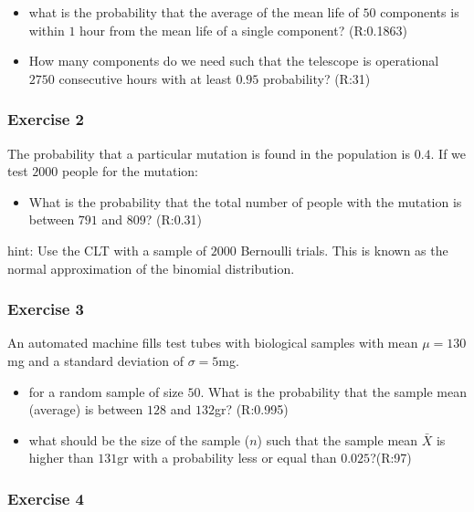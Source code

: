 \documentclass[
]{book}
\providecommand{\tightlist}{%
  \setlength{\itemsep}{0pt}\setlength{\parskip}{0pt}}
\begin{document}
\begin{itemize}
\item
  what is the probability that the average of the mean life of \(50\) components is within \(1\) hour from the mean life of a single component? (R:0.1863)
\item
  How many components do we need such that the telescope is operational \(2750\) consecutive hours with at least \(0.95\) probability? (R:31)
\end{itemize}

\hypertarget{exercise-2-8}{%
\subsubsection{Exercise 2}\label{exercise-2-8}}

The probability that a particular mutation is found in the population is \(0.4\). If we test \(2000\) people for the mutation:

\begin{itemize}
\tightlist
\item
  What is the probability that the total number of people with the mutation is between \(791\) and \(809\)? (R:0.31)
\end{itemize}

hint: Use the CLT with a sample of \(2000\) Bernoulli trials. This is known as the normal approximation of the binomial distribution.

\hypertarget{exercise-3-5}{%
\subsubsection{Exercise 3}\label{exercise-3-5}}

An automated machine fills test tubes with biological samples with mean \(\mu=130\)mg and a standard deviation of \(\sigma=5\)mg.

\begin{itemize}
\item
  for a random sample of size \(50\). What is the probability that
  the sample mean (average) is between \(128\) and \(132\)gr? (R:0.995)
\item
  what should be the size of the sample (\(n\)) such that the sample mean \(\bar{X}\) is higher than \(131\)gr with a probability less or equal than \(0.025\)?(R:97)
\end{itemize}

\hypertarget{exercise-4-3}{%
\subsubsection{Exercise 4}\label{exercise-4-3}}
\end{document}
